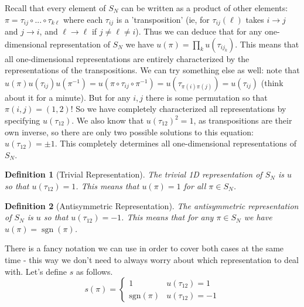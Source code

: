 \documentclass{article}
\DeclareMathOperator{\sgn}{\textrm{sgn}}
\newtheorem{defn}{Definition}
\begin{document}
Recall that every element of $S_N$ can be written as a product of other elements: $\pi = \tau_{ij} \circ ... \circ \tau_{k\ell}$ where each $\tau_{ij}$ is a 'transposition' (ie, for $\tau_{ij}(\ell)$ takes $i \to j$ and $j \to i$, and $\ell \to \ell$ if $j\neq \ell \neq i$). Thus we can deduce that for any one-dimensional representation of $S_N$ we have $u(\pi) = \prod_k u(\tau_{ij_k})$. This means that all one-dimensional representations are entirely characterized by the representations of the transpositions. We can try something else as well: note that $u(\pi)u(\tau_{ij})u(\pi^{-1}) = u(\pi\circ \tau_{ij}\circ \pi^{-1}) = u(\tau_{\pi(i)\pi(j)}) = u(\tau_{ij})$ (think about it for a minute). But for any $i,j$ there is some permutation so that $\pi(i,j) = (1,2)$! So we have completely characterized all representations by specifying $u(\tau_{12})$. We also know that $u(\tau_{12})^{2} = 1$, as transpositions are their own inverse, so there are only two possible solutions to this equation: $u(\tau_{12})=\pm1$. This completely determines all one-dimensional representations of $S_N$.
\begin{defn}[Trivial Representation]
The trivial 1D representation of $S_N$ is $u$ so that $u(\tau_{12}) = 1$. This means that $u(\pi) = 1$ for all $\pi \in S_N$.
\end{defn}
\begin{defn}[Antisymmetric Representation]
The antisymmetric representation of $S_N$ is $u$ so that $u(\tau_{12}) = -1$. This means that for any $\pi \in S_N$ we have $u(\pi) = \sgn(\pi)$.
\end{defn}

There is a fancy notation we can use in order to cover both cases at the same time - this way we don't need to always worry about which representation to deal with. Let's define $s$ as follows.
\[s(\pi)=\begin{cases}1 & u(\tau_{12})=1\\
\textrm{sgn}(\pi) & u(\tau_{12})=-1
\end{cases}\]
\pagebreak
\end{document}
